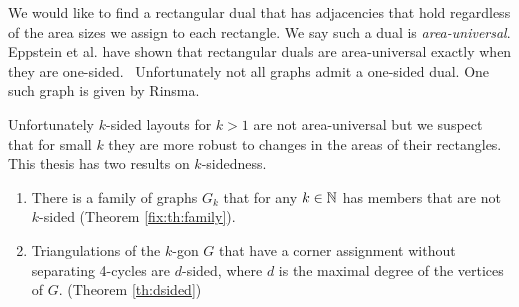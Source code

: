   We would like to find a rectangular dual that has adjacencies that hold regardless of the area sizes we assign to each rectangle. We say such a dual is \emph{area-universal}.
  Eppstein et al. have shown that rectangular duals are area-universal exactly when they are one-sided.~\cite{Eppstein2012} Unfortunately not all graphs admit a one-sided dual. One such graph is given by Rinsma.~\cite{Rinsma1987} 

  Unfortunately $k$-sided layouts for $k>1$ are not area-universal but we suspect that for small $k$ they are more robust to changes in the areas of their rectangles. This thesis has two results on $k$-sidedness.

  \begin{enumerate}
    \item There is a family of graphs $G_k$ that for any $k \in \mathbb{N}$ has members that are not $k$-sided (Theorem \ref{fix:th:family}).
    \item Triangulations of the $k$-gon $G$ that have a corner assignment without separating 4-cycles are $d$-sided, where $d$ is the maximal degree of the vertices of $G$. (Theorem \ref{th:dsided})
  \end{enumerate}
